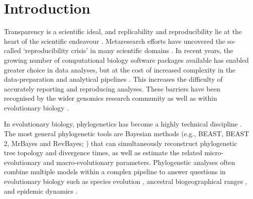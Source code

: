 \documentclass[10pt,letterpaper,table]{article}
\theoremstyle{definition}
\begin{document}



\linenumbers

\section{Introduction}
Transparency is a scientific ideal, and replicability and
reproducibility lie at the heart of the scientific endeavour
\cite{nas19,munafo17}. 
Metaresearch efforts have uncovered the so-called `reproducibility
crisis' \cite{baker16} in many scientific domains \cite{baker16}. 
In recent years, the growing number of computational biology software packages available has enabled greater choice in data analyses, 
but at the cost of increased complexity in the data-preparation and analytical pipelines \cite{eren2021community}. 
This increases the difficulty of accurately reporting and reproducing analyses. 
These barriers have been recognised by the wider genomics research community \cite{eren2021community} as well as within evolutionary biology \cite{oakley2014osiris}. 

In evolutionary biology, phylogenetics has become a highly technical discipline \cite{oakley2014osiris}. 
The most general phylogenetic tools are Bayesian methods (e.g., BEAST, BEAST 2, MrBayes and
RevBayes; \cite{beast,beast2,revbayes,mrbayes}) 
that can simultaneously reconstruct phylogenetic tree topology and divergence times, as well as estimate the related micro-evolutionary and macro-evolutionary parameters. 
Phylogenetic analyses often combine multiple models within a complex pipeline to answer questions in evolutionary biology such as species evolution \cite{gavryushkina17,ogilvie21,zhang21}, 
ancestral biogeographical ranges \cite{lemey10,landis18}, and epidemic dynamics \cite{faria21,douglas21}. 
\end{document}

